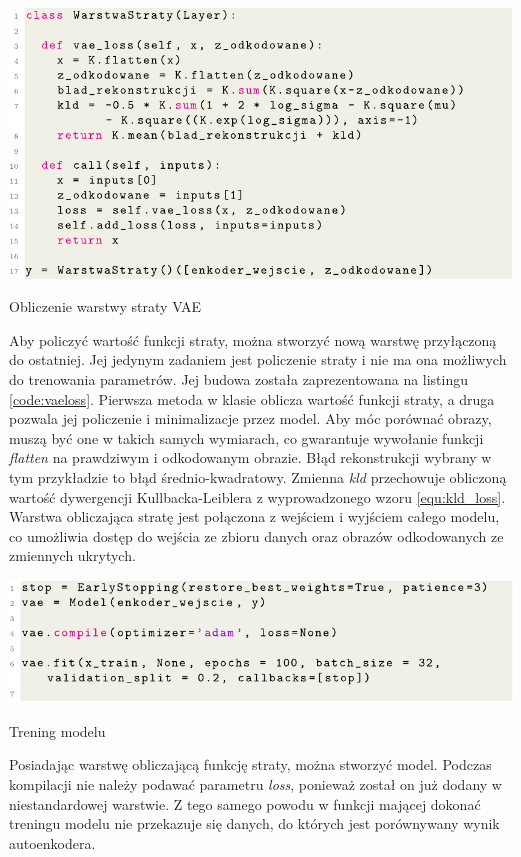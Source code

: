 \documentclass[a4paper,12pt,oneside]{book} %
\begin{document}
\begin{code}[h!]
	\centering
	\includegraphics[width=\linewidth]{vaeloss.pdf}
	\caption{Obliczenie warstwy straty VAE}
	\label{code:vaeloss}
\end{code}

\newpage
Aby policzyć wartość funkcji straty, można stworzyć nową warstwę przyłączoną do ostatniej. Jej jedynym zadaniem jest policzenie straty i nie ma ona możliwych do trenowania parametrów. Jej budowa została zaprezentowana na listingu \ref{code:vaeloss}. Pierwsza metoda w klasie oblicza wartość funkcji straty, a druga pozwala jej policzenie i minimalizacje przez model. Aby móc porównać obrazy, muszą być one w takich samych wymiarach, co gwarantuje wywołanie funkcji \textit{flatten} na prawdziwym i odkodowanym obrazie. Błąd rekonstrukcji wybrany w tym przykładzie to błąd średnio-kwadratowy. Zmienna \textit{kld} przechowuje obliczoną wartość dywergencji Kullbacka-Leiblera z wyprowadzonego wzoru \ref{equ:kld_loss}. Warstwa obliczająca stratę jest połączona z wejściem i wyjściem całego modelu, co umożliwia dostęp do wejścia ze zbioru danych oraz obrazów odkodowanych ze zmiennych ukrytych. 

\begin{code}[h!]
	\centering
	\includegraphics[width=\linewidth]{vaetrain.pdf}
	\caption{Trening modelu}
\end{code}

Posiadając warstwę obliczającą funkcję straty, można stworzyć model. Podczas kompilacji nie należy podawać parametru \textit{loss}, ponieważ został on już dodany w niestandardowej warstwie. Z tego samego powodu w funkcji mającej dokonać treningu modelu nie przekazuje się danych, do których jest porównywany wynik autoenkodera.
\end{document}

